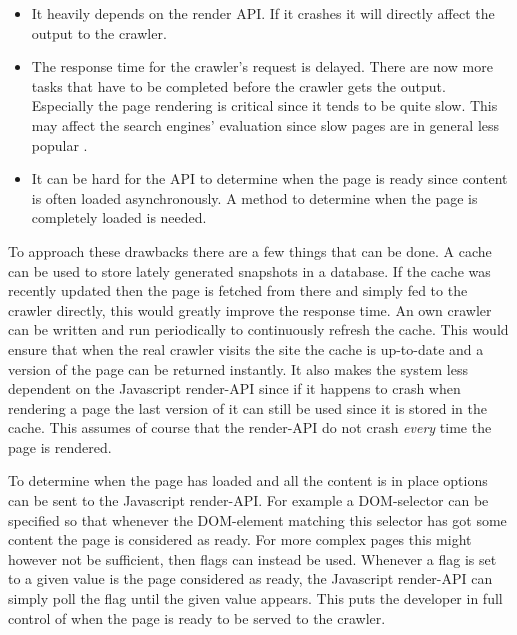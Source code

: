  \begin{itemize}
	\item It heavily depends on the render API. If it crashes it will directly affect the output to the crawler.
	\item The response time for the crawler's request is delayed. There are now more tasks that have to be completed before the crawler gets the output. Especially the page rendering is critical since it tends to be quite slow. This may affect the search engines' evaluation since slow pages are in general less popular \cite{slow_not_pop}.
	\item It can be hard for the API to determine when the page is ready since content is often loaded asynchronously. A method to determine when the page is completely loaded is needed.
\end{itemize}

To approach these drawbacks there are a few things that can be done. A cache can be used to store lately generated snapshots in a database. If the cache was recently updated then the page is fetched from there and simply fed to the crawler directly, this would greatly improve the response time. An own crawler can be written and run periodically to continuously refresh the cache. This would ensure that when the real crawler visits the site the cache is up-to-date and a version of the page can be returned instantly. It also makes the system less dependent on the Javascript render-API since if it happens to crash when rendering a page the last version of it can still be used since it is stored in the cache. This assumes of course that the render-API do not crash {\em every} time the page is rendered.

To determine when the page has loaded and all the content is in place options can be sent to the Javascript render-API. For example a DOM-selector can be specified so that whenever the DOM-element matching this selector has got some content the page is considered as ready. For more complex pages this might however not be sufficient, then flags can instead be used. Whenever a flag is set to a given value is the page considered as ready, the Javascript render-API can simply poll the flag until the given value appears. This puts the developer in full control of when the page is ready to be served to the crawler.
